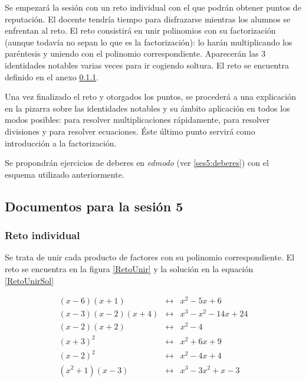 Se empezará la sesión con un reto individual con el que podrán obtener puntos de reputación.
%
El docente tendría tiempo para disfrazarse mientras los alumnos se enfrentan al reto.
%
El reto consistirá en unir polinomios con su factorización (aunque todavía no sepan lo que es la factorización): lo harán multiplicando los paréntesis y uniendo con el polinomio correspondiente.
%
Aparecerán las 3 identidades notables varias veces para ir cogiendo soltura.
%
El reto se encuentra definido en el anexo \ref{app:ses5:indiv}.

Una vez finalizado el reto y otorgados los puntos, se procederá a una explicación en la pizarra sobre las identidades notables y su ámbito aplicación en todos los modos posibles:
%
para resolver multiplicaciones rápidamente, para resolver divisiones y para resolver ecuaciones.
%
Éste último punto servirá como introducción a la factorización.


Se propondrán ejercicios de deberes en \textit{edmodo} (ver \ref{ses5:deberes}) con el esquema utilizado anteriormente.


\subsection{Documentos para la sesión 5}

\subsubsection{Reto individual}
\label{app:ses5:indiv}

Se trata de unir cada producto de factores con su polinomio correspondiente. 
El reto se encuentra en la figura \ref{RetoUnir} y la solución en la equación \ref{RetoUnirSol}

\begin{equation}
\label{RetoUnirSol}
	\begin{array}{lcr}
		(x-6)(x+1) & \longleftrightarrow &  x^2-5x+6\\
		(x-3)(x-2)(x+4) & \longleftrightarrow & x^3-x^2-14x+24\\
		(x-2)(x+2) & \longleftrightarrow & x^2-4\\
		(x+3)^2 & \longleftrightarrow & x^2+6x+9\\
		(x-2)^2 & \longleftrightarrow & x^2-4x+4\\
		(x^2+1)(x-3) & \longleftrightarrow & x^3-3x^2+x-3\\
	\end{array}
\end{equation}



